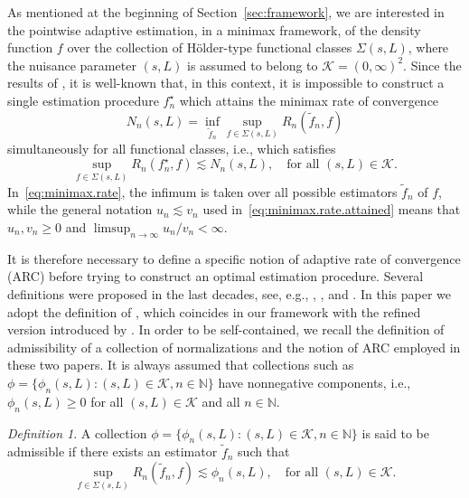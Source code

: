 \documentclass[bj,authoryear]{imsart}
\numberwithin{equation}{section}
\theoremstyle{plain}
\theoremstyle{remark}
\newtheorem{definition}{Definition}
\newcommand{\N}{\mathbb{N}}
\newcommand{\1}{\mathds{1}}
\newcommand{\pwrisk}{R_n}
\begin{document}
    As mentioned at the beginning of Section~\ref{sec:framework}, we are interested in the pointwise adaptive estimation, in a minimax framework, of the density function $f$ over the collection of H\"older-type functional classes $\Sigma(s,L)$, where the nuisance parameter $(s,L)$ is assumed to belong to $\mathcal{K} = (0,\infty)^2$.
    Since the results of \cite{Lepski1991adaptive}, it is well-known that, in this context, it is impossible to construct a single estimation procedure $f_n^{\star}$ which attains the minimax rate of convergence
    \begin{equation}\label{eq:minimax.rate}
        N_n(s,L) = \inf_{\tilde{f}_n} \sup_{f\in \Sigma(s,L)}\pwrisk(\tilde{f}_n, f)
    \end{equation}
    simultaneously for all functional classes, i.e., which satisfies
    \begin{equation}\label{eq:minimax.rate.attained}
        \sup_{f\in \Sigma(s,L)}\pwrisk(f_n^{\star}, f) \lesssim N_n(s,L), \quad \text{for all } (s,L)\in \mathcal{K}.
    \end{equation}
    In~\eqref{eq:minimax.rate}, the infimum is taken over all possible estimators $\tilde{f}_n$ of $f$, while the general notation $u_n \lesssim v_n$ used in~\eqref{eq:minimax.rate.attained} means that $u_n,v_n \geq 0$ and $\limsup_{n\to\infty} u_n / v_n <\infty$.

    It is therefore necessary to define a specific notion of adaptive rate of convergence (ARC) before trying to construct an optimal estimation procedure. Several definitions were proposed in the last decades, see, e.g., \cite{Lepski1991adaptive}, \cite{Tsybakov1998}, \cite{K-MMS-2014} and \cite{Rebelles2015}. In this paper we adopt the definition of \cite{K-MMS-2014}, which coincides in our framework with the refined version introduced by \cite{Rebelles2015}. In order to be self-contained, we recall the definition of admissibility of a collection of normalizations and the notion of ARC employed in these two papers. It is always assumed that collections such as $\phi = \{\phi_n(s,L) : (s,L)\in \mathcal{K}, n\in \N\}$ have nonnegative components, i.e., $\phi_n(s,L)\geq 0$ for all $(s,L)\in \mathcal{K}$ and all $n\in \N$.

    \begin{definition}\label{def:admissibility}
        A collection $\phi = \{\phi_n(s,L) : (s,L)\in \mathcal{K}, n\in \N\}$ is said to be admissible if there exists an estimator $\tilde{f}_n$ such that
        \begin{equation*}
            \sup_{f\in \Sigma(s,L)}\pwrisk(\tilde{f}_n, f)\lesssim \phi_n(s,L),
            \quad
            \text{for all } (s,L)\in \mathcal{K}.
        \end{equation*}
    \end{definition}
\end{document}
